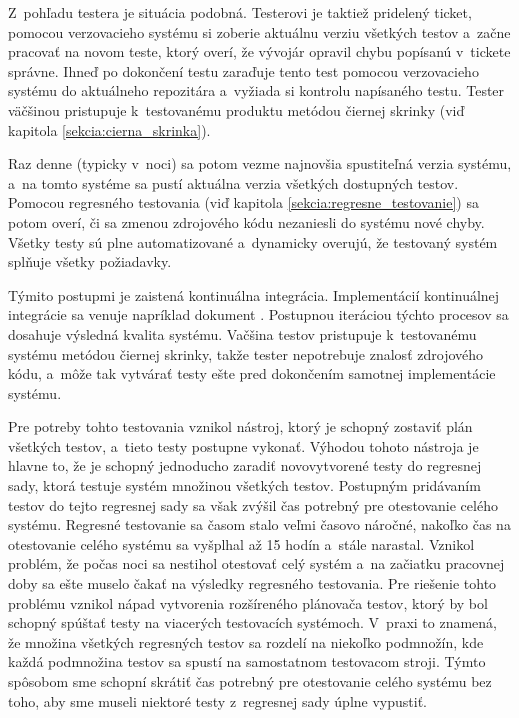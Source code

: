 Z~pohľadu testera je situácia podobná. Testerovi je taktiež pridelený ticket, pomocou verzovacieho systému si zoberie aktuálnu verziu
všetkých testov a~začne pracovať na novom teste, ktorý overí, že vývojár opravil chybu popísanú v~tickete správne.
Ihneď po dokončení testu zaraďuje tento test pomocou verzovacieho systému do aktuálneho repozitára a~vyžiada si
kontrolu napísaného testu. Tester väčšinou pristupuje k~testovanému produktu metódou čiernej skrinky (viď kapitola \ref{sekcia:cierna_skrinka}).

Raz denne (typicky v~noci) sa potom vezme najnovšia spustiteľná verzia systému, a~na tomto systéme sa pustí aktuálna verzia
všetkých dostupných testov. Pomocou regresného testovania (viď kapitola \ref{sekcia:regresne_testovanie}) sa potom overí, či sa zmenou zdrojového kódu nezaniesli do systému nové
chyby. Všetky testy sú plne automatizované a~dynamicky overujú, že testovaný systém splňuje všetky požiadavky.

Týmito postupmi je zaistená kontinuálna integrácia. Implementácií kontinuálnej integrácie 
sa venuje napríklad dokument \cite{Continuous_integration_implementation}. 
Postupnou iteráciou týchto procesov sa dosahuje výsledná kvalita systému. Vačšina testov pristupuje k~testovanému
systému metódou čiernej skrinky, takže tester nepotrebuje znalosť zdrojového kódu, a~môže tak vytvárať testy
ešte pred dokončením samotnej implementácie systému. 

Pre potreby tohto testovania vznikol nástroj, ktorý je schopný zostaviť plán všetkých testov, a~tieto testy postupne vykonať.
Výhodou tohoto nástroja je hlavne to, že je schopný jednoducho zaradiť novovytvorené testy do regresnej sady, ktorá
testuje systém množinou všetkých testov. Postupným pridávaním testov do tejto regresnej sady sa však zvýšil čas potrebný pre otestovanie celého systému.
Regresné testovanie sa časom stalo veľmi časovo náročné, nakoľko čas na otestovanie celého systému sa vyšplhal až 15 hodín a~stále narastal.
Vznikol problém, že počas noci sa nestihol otestovať celý systém a~na začiatku pracovnej doby sa ešte muselo čakať na výsledky regresného testovania.
Pre riešenie tohto problému vznikol nápad vytvorenia rozšíreného plánovača testov, ktorý by bol schopný spúštať testy na viacerých testovacích systémoch.
V~praxi to znamená, že množina všetkých regresných testov sa rozdelí na niekoľko podmnožín, kde každá podmnožina testov sa spustí na samostatnom
testovacom stroji. Týmto spôsobom sme schopní skrátiť čas potrebný pre otestovanie celého systému bez toho, aby sme museli niektoré testy z~regresnej sady 
úplne vypustiť. 



